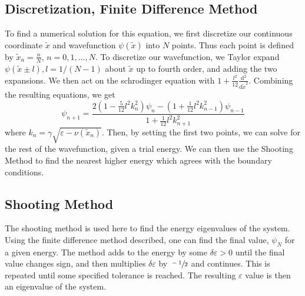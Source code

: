 \documentclass[10pt,a4paper]{article}
\theoremstyle{definition}
\theoremstyle{remark}
\begin{document}
\subsection{Discretization, Finite Difference Method}
\label{sec: discretization,finite_diff}
To find a numerical solution for this equation, we first discretize our continuous coordinate $\tilde{x}$ and wavefunction $\psi(\tilde{x})$ into $N$ points. Thus each point is defined by $\tilde{x}_n = \frac{n}{N}$, $n = 0, 1, ..., N$. To discretize our wavefunction, we Taylor expand $\psi(\tilde{x}\pm l), l=1/(N-1)$ about $\tilde{x}$ up to fourth order, and adding the two expansions. We then act on the schrodinger equation with $ 1 + \frac{l^2}{12}\frac{\mathrm{d}^2}{\mathrm{d}\tilde{x}^2}$. Combining the resulting equations, we get
\begin{equation}
    \psi_{n+1} = \frac{2(1-\frac{5}{12}l^2k_n^2)\psi_n - (1 + \frac{1}{12}l^2k_{n-1}^2)\psi_{n-1}}{1+\frac{1}{12}l^2k_{n+1}^2}
\end{equation}
where $k_n = \gamma\sqrt{\varepsilon-\nu(\tilde{x}_n)}$. Then, by setting the first two points, we can solve for the rest of the wavefunction, given a trial energy. We can then use the Shooting Method to find the nearest higher energy which agrees with the boundary conditions.
\subsection{Shooting Method}
\label{sec: shooting_method}
The shooting method is used here to find the energy eigenvalues of the system. Using the finite difference method described, one can find the final value, $\psi_N$ for a given energy. The method adds to the energy by some $\delta\varepsilon>0$ until the final value changes sign, and then multiplies $\delta\varepsilon$ by $\sfrac{-1}{2}$ and continues. This is repeated until some specified tolerance is reached. The resulting $\varepsilon$ value is then an eigenvalue of the system.
\end{document}
